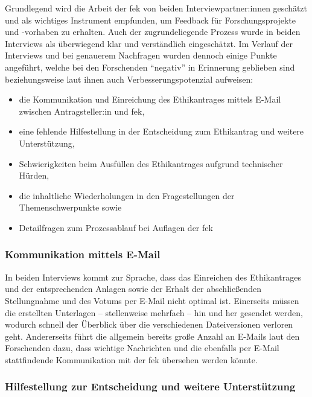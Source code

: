\documentclass[a4paper,12pt,twoside]{scrreprt}
\begin{document}
Grundlegend wird die Arbeit der \ac{fek} von beiden Interviewpartner:innen geschätzt und als wichtiges Instrument empfunden, um Feedback für Forschungsprojekte und -vorhaben zu erhalten. Auch der zugrundeliegende Prozess wurde in beiden Interviews als überwiegend klar und verständlich eingeschätzt. Im Verlauf der Interviews und bei genauerem Nachfragen wurden dennoch einige Punkte angeführt, welche bei den Forschenden \enquote{negativ} in Erinnerung geblieben sind beziehungsweise laut ihnen auch Verbesserungspotenzial aufweisen:
\begin{itemize}
    \item die Kommunikation und Einreichung des Ethikantrages mittels E-Mail zwischen Antragsteller:in und \ac{fek},
    \item eine fehlende Hilfestellung in der Entscheidung zum Ethikantrag und weitere Unterstützung,
    \item Schwierigkeiten beim Ausfüllen des Ethikantrages aufgrund technischer Hürden,
    \item die inhaltliche Wiederholungen in den Fragestellungen der Themenschwerpunkte sowie
    \item Detailfragen zum Prozessablauf bei Auflagen der \ac{fek}
\end{itemize}

\subsubsection*{Kommunikation mittels E-Mail}
\label{sub-sub-sec:kommunikation-email}

In beiden Interviews kommt zur Sprache, dass das Einreichen des Ethikantrages und der entsprechenden Anlagen sowie der Erhalt der abschließenden Stellungnahme und des Votums per E-Mail nicht optimal ist. Einerseits müssen die erstellten Unterlagen -- stellenweise mehrfach -- hin und her gesendet werden, wodurch schnell der Überblick über die verschiedenen Dateiversionen verloren geht. Andererseits führt die allgemein bereits große Anzahl an E-Mails laut den Forschenden dazu, dass wichtige Nachrichten und die ebenfalls per E-Mail stattfindende Kommunikation mit der \ac{fek} übersehen werden könnte.

\subsubsection*{Hilfestellung zur Entscheidung und weitere Unterstützung}
\label{sub-sub-sec:hilfestellung-unterstützung}
\end{document}

